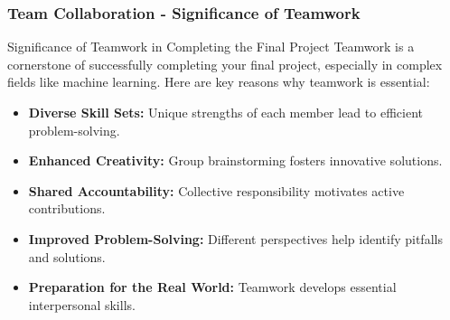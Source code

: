 \documentclass[aspectratio=169]{beamer}
\begin{document}
\begin{frame}[fragile]
    \frametitle{Team Collaboration - Significance of Teamwork}
    
    \begin{block}{Significance of Teamwork in Completing the Final Project}
        Teamwork is a cornerstone of successfully completing your final project, especially in complex fields like machine learning. Here are key reasons why teamwork is essential:
    \end{block}
    
    \begin{itemize}
        \item \textbf{Diverse Skill Sets:} Unique strengths of each member lead to efficient problem-solving.
        \item \textbf{Enhanced Creativity:} Group brainstorming fosters innovative solutions.
        \item \textbf{Shared Accountability:} Collective responsibility motivates active contributions.
        \item \textbf{Improved Problem-Solving:} Different perspectives help identify pitfalls and solutions.
        \item \textbf{Preparation for the Real World:} Teamwork develops essential interpersonal skills.
    \end{itemize}
\end{frame}
\end{document}
